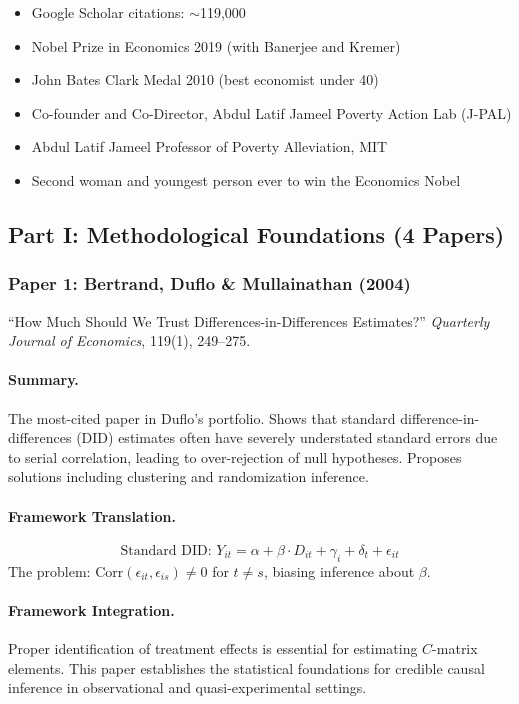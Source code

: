 \documentclass[12pt,a4paper]{article}
\begin{document}
\begin{itemize}
  \item Google Scholar citations: $\sim$119,000
  \item Nobel Prize in Economics 2019 (with Banerjee and Kremer)
  \item John Bates Clark Medal 2010 (best economist under 40)
  \item Co-founder and Co-Director, Abdul Latif Jameel Poverty Action Lab (J-PAL)
  \item Abdul Latif Jameel Professor of Poverty Alleviation, MIT
  \item Second woman and youngest person ever to win the Economics Nobel
\end{itemize}

\subsection{Part I: Methodological Foundations (4 Papers)}

\subsubsection{Paper 1: Bertrand, Duflo \& Mullainathan (2004)}

``How Much Should We Trust Differences-in-Differences Estimates?''
\textit{Quarterly Journal of Economics}, 119(1), 249--275.

\paragraph{Summary.}
The most-cited paper in Duflo's portfolio. Shows that standard difference-in-differences
(DID) estimates often have severely understated standard errors due to serial correlation,
leading to over-rejection of null hypotheses. Proposes solutions including clustering and
randomization inference.

\paragraph{Framework Translation.}
\begin{equation}
  \text{Standard DID: } Y_{it} = \alpha + \beta \cdot D_{it} + \gamma_i + \delta_t + \epsilon_{it}
\end{equation}
The problem: $\text{Corr}(\epsilon_{it}, \epsilon_{is}) \neq 0$ for $t \neq s$, biasing inference about $\beta$.

\paragraph{Framework Integration.}
Proper identification of treatment effects is essential for estimating $C$-matrix elements.
This paper establishes the statistical foundations for credible causal inference in
observational and quasi-experimental settings.
\end{document}
